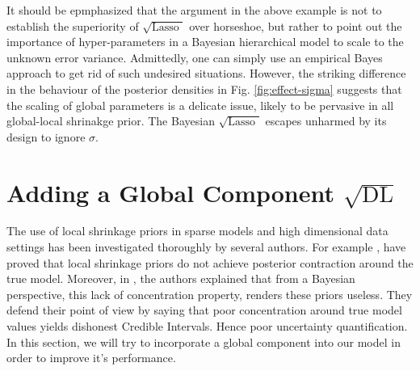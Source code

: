 \documentclass[chapters]{uamaththesis}
\def\sql{$\sqrt{\text{Lasso }}$}
\begin{document}
It should be epmphasized that the argument in the above example is not to establish the superiority of \sql{} over horseshoe, but rather to point out the importance of hyper-parameters in a Bayesian hierarchical model to scale to the unknown error variance. Admittedly, one can simply use an empirical Bayes approach to get rid of such undesired situations. However, the striking difference in the behaviour of the posterior densities in Fig. \ref{fig:effect-sigma} suggests that the scaling of global parameters is a delicate issue, likely to be pervasive in all global-local shrinakge prior. The Bayesian \sql{} escapes unharmed by its design to ignore $\sigma$. 


\section{Adding a Global Component $ \sqrt{\text{DL}} $}

The use of local shrinkage priors in sparse models and high dimensional data settings has been investigated thoroughly by several authors. For example \citep{castillo2015bayesian} , have proved that local shrinkage priors do not achieve posterior contraction around the true model. Moreover, in \cite{castillo2015bayesian} , the authors explained that from a Bayesian perspective, this lack of concentration property, renders these priors useless. They defend their point of view by saying that poor concentration around true model values yields dishonest Credible Intervals. Hence poor uncertainty quantification. In this section, we will try to incorporate a global component into our model in order to improve it's performance.
\end{document}
